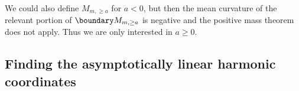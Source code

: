\documentclass[titlepage,numbers=noenddot,oneside,%
cleardoublepage=empty,paper=a4,fontsize=11pt,%
english,%
]{scrartcl}
\newcommand*{\mathcomma}{\,,}
\newcommand*{\mathfullstop}{\,.}
\begin{document}



\begin{remark}
    We could also define \( M_{m,\geq a} \) for \( a<0 \), but then the mean curvature of the relevant portion of \( \modifiedschwarzschildboundary \) is negative and the positive mass theorem does not apply. Thus we are only interested in \( a\geq 0 \).
\end{remark}
\subsection{Finding the asymptotically linear harmonic coordinates}
\end{document}
